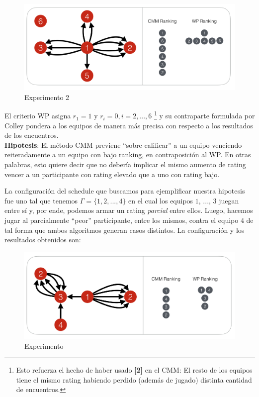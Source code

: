 \begin{figure}[h!]
  \begin{center}
	\includegraphics[scale=0.50]{imagenes/cualitative/comparative/comparative2.png}
	\caption{Experimento 2}
  \end{center}
\end{figure}
\newpage

El criterio WP asigna $r_1 = 1$ y $r_i = 0, i = 2, ..., 6$ \footnote{Esto refuerza el hecho de haber usado \textbf{[2]} en el CMM: El resto de los equipos tiene el mismo rating habiendo perdido (además de jugado) distinta cantidad de encuentros.} y su contraparte formulada por Colley pondera a los equipos de manera m\'as precisa con respecto a los resultados de los encuentros. \\

\textbf{Hipotesis}: El m\'etodo CMM previene ``sobre-calificar'' a un equipo venciendo reiteradamente a un equipo con bajo ranking, en contraposici\'on al WP. En otras palabras, esto quiere decir que no deber\'ia implicar el mismo aumento de rating vencer a un participante con rating elevado que a uno con rating bajo. 

La configuraci\'on del schedule que buscamos para ejemplificar nuestra hipotesis fue uno tal que tenemos $\Gamma = \{1,2,...,4\}$ en el cual los equipos $1$, ..., $3$ juegan entre s\'i y, por ende, podemos armar un rating \textit{parcial} entre ellos. Luego, hacemos jugar al parcialmente ``peor'' participante, entre los mismos, contra el equipo $4$ de tal forma que ambos algoritmos generan casos distintos. La configuraci\'on y los resultados obtenidos son:

\begin{figure}[h!]
  \begin{center}
	\includegraphics[scale=0.50]{imagenes/cualitative/comparative/comparative3.png}
	\caption{Experimento}
  \end{center}
\end{figure}


